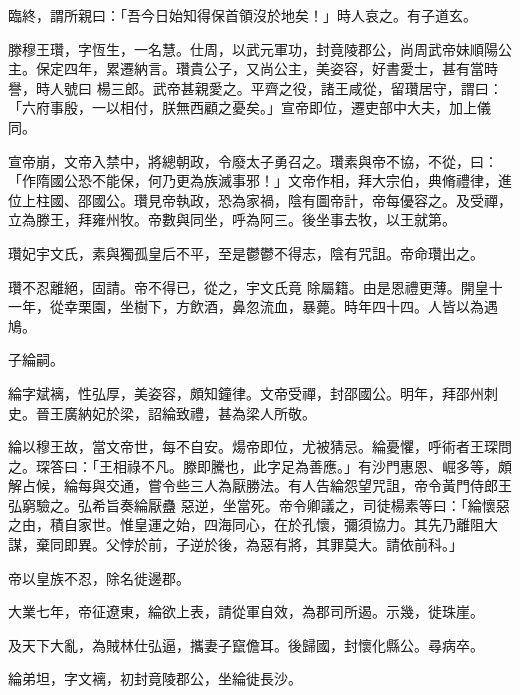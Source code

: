 \begin{pinyinscope}
 臨終，謂所親曰：「吾今日始知得保首領沒於地矣！」時人哀之。有子道玄。



 滕穆王瓚，字恆生，一名慧。仕周，以武元軍功，封竟陵郡公，尚周武帝妹順陽公主。保定四年，累遷納言。瓚貴公子，又尚公主，美姿容，好書愛士，甚有當時譽，時人號曰
 楊三郎。武帝甚親愛之。平齊之役，諸王咸從，留瓚居守，謂曰：「六府事殷，一以相付，朕無西顧之憂矣。」宣帝即位，遷吏部中大夫，加上儀同。



 宣帝崩，文帝入禁中，將總朝政，令廢太子勇召之。瓚素與帝不協，不從，曰：「作隋國公恐不能保，何乃更為族滅事邪！」文帝作相，拜大宗伯，典脩禮律，進位上柱國、邵國公。瓚見帝執政，恐為家禍，陰有圖帝計，帝每優容之。及受禪，立為滕王，拜雍州牧。帝數與同坐，呼為阿三。後坐事去牧，以王就第。



 瓚妃宇文氏，素與獨孤皇后不平，至是鬱鬱不得志，陰有咒詛。帝命瓚出之。



 瓚不忍離絕，固請。帝不得已，從之，宇文氏竟
 除屬籍。由是恩禮更薄。開皇十一年，從幸栗園，坐樹下，方飲酒，鼻忽流血，暴薨。時年四十四。人皆以為遇鳩。



 子綸嗣。



 綸字斌褵，性弘厚，美姿容，頗知鐘律。文帝受禪，封邵國公。明年，拜邵州刺史。晉王廣納妃於梁，詔綸致禮，甚為梁人所敬。



 綸以穆王故，當文帝世，每不自安。煬帝即位，尤被猜忌。綸憂懼，呼術者王琛問之。琛答曰：「王相祿不凡。滕即騰也，此字足為善應。」有沙門惠恩、崛多等，頗解占候，綸每與交通，嘗令些三人為厭勝法。有人告綸怨望咒詛，帝令黃門侍郎王弘窮驗之。弘希旨奏綸厭蠱
 惡逆，坐當死。帝令卿議之，司徒楊素等曰：「綸懷惡之由，積自家世。惟皇運之始，四海同心，在於孔懷，彌須協力。其先乃離阻大謀，棄同即異。父悖於前，子逆於後，為惡有將，其罪莫大。請依前科。」



 帝以皇族不忍，除名徙邊郡。



 大業七年，帝征遼東，綸欲上表，請從軍自效，為郡司所遏。示幾，徙珠崖。



 及天下大亂，為賊林仕弘逼，攜妻子竄儋耳。後歸國，封懷化縣公。尋病卒。



 綸弟坦，字文褵，初封竟陵郡公，坐綸徙長沙。




\end{pinyinscope}
